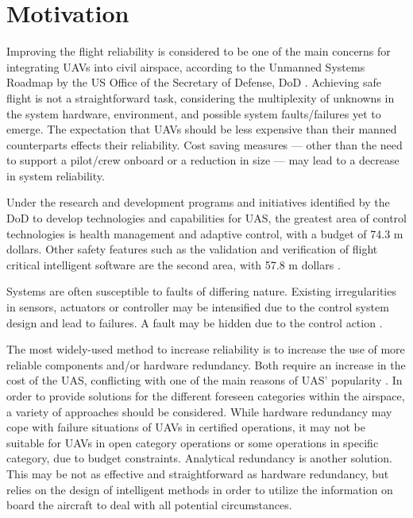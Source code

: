 \section{Motivation}

Improving the flight reliability is considered to be one of the main concerns for integrating UAVs into civil airspace, according to the Unmanned Systems Roadmap by the US Office of the Secretary of Defense, DoD \cite{UnmannedSystemsRoadmapDoD}. 
Achieving safe flight is not a straightforward task, considering the multiplexity of unknowns in the system hardware, environment, and possible system faults/failures yet to emerge. 
The expectation that UAVs should be less expensive than their manned counterparts effects their reliability. Cost saving measures --- other than the need to support a pilot/crew onboard or a reduction in size --- may lead to a decrease in system reliability.

Under the research and development programs and initiatives identified by the DoD to develop technologies and capabilities for UAS, the greatest area of control technologies is health management and adaptive control, with a budget of 74.3 m dollars. 
Other safety features such as the validation and verification of flight critical intelligent software are the second area, with 57.8 m dollars \cite{UnmannedSystemsRoadmapDoD}. 

Systems are often susceptible to faults of differing nature. Existing irregularities in sensors, actuators or controller may be intensified due to the control system design and lead to failures. A fault may be hidden due to the control action \cite{ducard2009fault}.

The most widely-used method to increase reliability is to increase the use of more reliable components and/or hardware redundancy. Both require an increase in the cost of the UAS, conflicting with one of the main reasons of UAS' popularity \cite{angelov2012sense}. In order to provide solutions for the different foreseen categories within the airspace, a variety of approaches should be considered. While hardware redundancy may cope with failure situations of UAVs in certified operations, it may not be suitable for UAVs in open category operations or some operations in specific category, due to budget constraints. Analytical redundancy is another solution. This may be not as effective and straightforward as hardware redundancy, but relies on the design of intelligent methods in order to utilize the information on board the aircraft to deal with all potential circumstances.  

